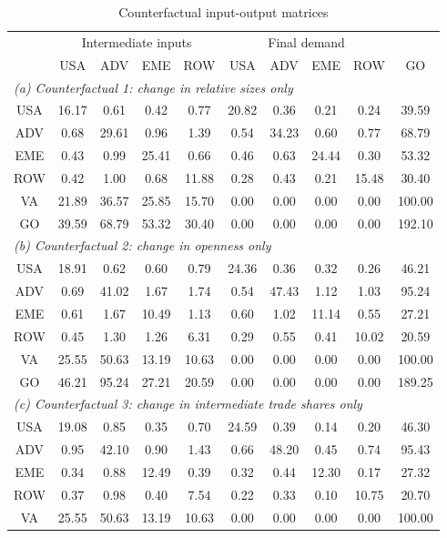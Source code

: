 \begin{table}[p]
\begin{center}
\caption{Counterfactual input-output matrices}
\label{tab:iomat-counter}
\small
\begin{tabular}{cccccccccc}
\toprule
& \multicolumn{4}{c}{Intermediate inputs}& \multicolumn{4}{c}{Final demand} & \\
\cmidrule(rl){2-5}\cmidrule(rl){6-9}
 &USA &ADV &EME &ROW &USA &ADV &EME &ROW& GO\\
\midrule
\multicolumn{10}{l}{\textit{(a) Counterfactual 1: change in relative sizes only}}\\
USA& 16.17& 0.61& 0.42& 0.77& 20.82& 0.36& 0.21& 0.24& 39.59 \\
ADV& 0.68& 29.61& 0.96& 1.39& 0.54& 34.23& 0.60& 0.77& 68.79 \\
EME& 0.43& 0.99& 25.41& 0.66& 0.46& 0.63& 24.44& 0.30& 53.32 \\
ROW& 0.42& 1.00& 0.68& 11.88& 0.28& 0.43& 0.21& 15.48& 30.40 \\
VA& 21.89& 36.57& 25.85& 15.70& 0.00& 0.00& 0.00& 0.00& 100.00\\
GO& 39.59& 68.79& 53.32& 30.40& 0.00& 0.00& 0.00& 0.00& 192.10\\
\midrule
\multicolumn{10}{l}{\textit{(b) Counterfactual 2: change in openness only}}\\
USA& 18.91& 0.62& 0.60& 0.79& 24.36& 0.36& 0.32& 0.26& 46.21 \\
ADV& 0.69& 41.02& 1.67& 1.74& 0.54& 47.43& 1.12& 1.03& 95.24 \\
EME& 0.61& 1.67& 10.49& 1.13& 0.60& 1.02& 11.14& 0.55& 27.21 \\
ROW& 0.45& 1.30& 1.26& 6.31& 0.29& 0.55& 0.41& 10.02& 20.59 \\
VA& 25.55& 50.63& 13.19& 10.63& 0.00& 0.00& 0.00& 0.00& 100.00\\
GO& 46.21& 95.24& 27.21& 20.59& 0.00& 0.00& 0.00& 0.00& 189.25\\
\midrule
\multicolumn{10}{l}{\textit{(c) Counterfactual 3: change in intermediate trade shares only}}\\
USA& 19.08& 0.85& 0.35& 0.70& 24.59& 0.39& 0.14& 0.20& 46.30 \\
ADV& 0.95& 42.10& 0.90& 1.43& 0.66& 48.20& 0.45& 0.74& 95.43 \\
EME& 0.34& 0.88& 12.49& 0.39& 0.32& 0.44& 12.30& 0.17& 27.32 \\
ROW& 0.37& 0.98& 0.40& 7.54& 0.22& 0.33& 0.10& 10.75& 20.70 \\
VA& 25.55& 50.63& 13.19& 10.63& 0.00& 0.00& 0.00& 0.00& 100.00\\

\end{tabular}
\end{center}
\end{table}
